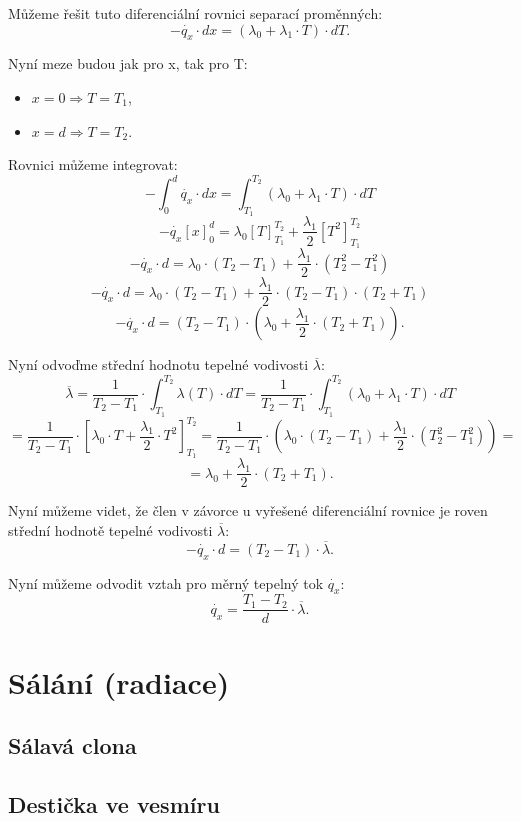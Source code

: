 \documentclass{article}
\begin{document}
Můžeme řešit tuto diferenciální rovnici separací proměnných:
$$
    - \dot{q_x} \cdot dx = \left( \lambda_0 + \lambda_1 \cdot T \right) \cdot dT.
$$

Nyní meze budou jak pro x, tak pro T:
\begin{itemize}
    \item $x = 0 \Rightarrow T = T_1$,
    \item $x = d \Rightarrow T = T_2$.
\end{itemize}

Rovnici můžeme integrovat:
$$
    - \int_{0}^{d} \dot{q_x} \cdot dx = \int_{T_1}^{T_2} \left( \lambda_0 + \lambda_1 \cdot T \right) \cdot dT
$$
$$
    - \dot{q_x} \left[ x \right]_{0}^{d} = \lambda_0 \left[ T \right]_{T_1}^{T_2} + \frac{\lambda_1}{2} \left[ T^2 \right]_{T_1}^{T_2}
$$
$$
    - \dot{q_x} \cdot d = \lambda_0 \cdot (T_2 - T_1) + \frac{\lambda_1}{2} \cdot (T_2^2 - T_1^2)
$$
$$
    - \dot{q_x} \cdot d = \lambda_0 \cdot (T_2 - T_1) + \frac{\lambda_1}{2} \cdot (T_2 - T_1) \cdot (T_2 + T_1)
$$
$$
    - \dot{q_x} \cdot d = (T_2 - T_1) \cdot \left( \lambda_0 + \frac{\lambda_1}{2} \cdot (T_2 + T_1) \right).
$$

Nyní odvoďme střední hodnotu tepelné vodivosti $\overline{\lambda}$:
$$
    \overline{\lambda} = \frac{1}{T_2 - T_1} \cdot \int_{T_1}^{T_2} \lambda (T) \cdot dT = \frac{1}{T_2 - T_1} \cdot \int_{T_1}^{T_2} \left( \lambda_0 + \lambda_1 \cdot T \right) \cdot dT
$$
$$
    = \frac{1}{T_2 - T_1} \cdot \left[ \lambda_0 \cdot T + \frac{\lambda_1}{2} \cdot T^2 \right]_{T_1}^{T_2} = \frac{1}{T_2 - T_1} \cdot \left( \lambda_0 \cdot (T_2 - T_1) + \frac{\lambda_1}{2} \cdot (T_2^2 - T_1^2) \right) =
$$
$$
    = \lambda_0 + \frac{\lambda_1}{2} \cdot (T_2 + T_1).
$$

Nyní můžeme videt, že člen v závorce u vyřešené diferenciální rovnice je roven střední hodnotě tepelné vodivosti $\overline{\lambda}$:
$$
    - \dot{q_x} \cdot d = (T_2 - T_1) \cdot \overline{\lambda}.
$$

Nyní můžeme odvodit vztah pro měrný tepelný tok $\dot{q_x}$:
$$
    \dot{q_x} = \frac{T_1 - T_2}{d} \cdot \overline{\lambda}.
$$

\newpage



\section{ Sálání (radiace) \spicy \spicy}


\subsection{Sálavá clona}


\subsection{Destička ve vesmíru}
\end{document}
